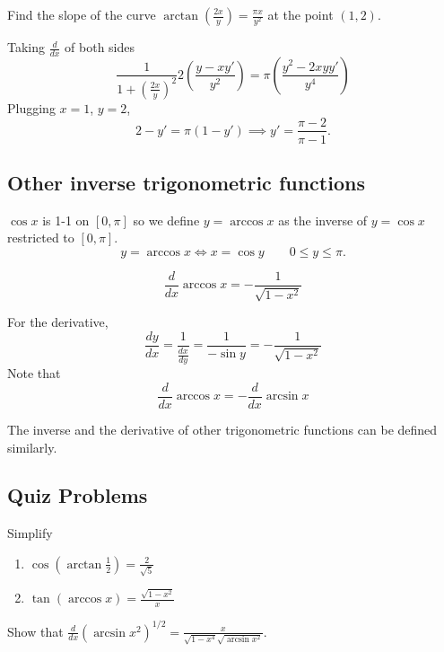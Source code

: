 \documentclass[calc1-main.tex]{subfiles}
\begin{document}
\begin{example}
  Find the slope of the curve $\arctan\left( \frac{2x}{y} \right) = \frac{\pi x}{y^2}$ at the point $(1, 2)$.
\end{example}

\begin{solution}
  Taking $\frac{d}{dx}$ of both sides
  \[
    \frac{1}{1+\left( \frac{2x}{y} \right)^2} 2\left( \frac{y-x y'}{y^2} \right) = \pi \left( \frac{y^2 - 2x y y'}{y^4} \right)
  \]
  Plugging $x=1$, $y=2$,
  \[
    2- y' = \pi (1- y') \implies y' = \frac{\pi-2}{\pi-1}.
  \]
\end{solution}

\subsection*{Other inverse trigonometric functions}
$\cos x$ is 1-1 on $[0, \pi]$ so we define $y=\arccos x$ as the inverse of $y=\cos x$ restricted to $[0, \pi]$.
\[
  y = \arccos x \iff x = \cos y \qquad 0 \le y \le \pi.
\]

\begin{theorem}
  \[
    \frac{d}{dx} \arccos x = -\frac{1}{\sqrt{1-x^2}}
  \]

\end{theorem}
For the derivative,
\[
  \frac{dy}{dx} = \frac{1}{\frac{dx}{dy}} = \frac{1}{-\sin y} = -\frac{1}{\sqrt{1-x^2}}
\]
Note that
\[
  \frac{d}{dx} \arccos x = -\frac{d}{dx} \arcsin x
\]


The inverse and the derivative of other trigonometric functions can be defined similarly.

\subsection*{Quiz Problems}
\begin{example}
  Simplify
  \begin{enumerate}
    \item $\cos(\arctan \frac{1}{2}) = \frac{2}{\sqrt{5}}$

    \item $\tan (\arccos x)= \frac{\sqrt{1-x^2}}{x}$

  \end{enumerate}
\end{example}
\begin{example}
  Show that $\frac{d}{dx}(\arcsin x^2)^{1/2} = \frac{x}{\sqrt{1-x^4}\sqrt{\arcsin x^2}}$.
\end{example}

\end{document}
